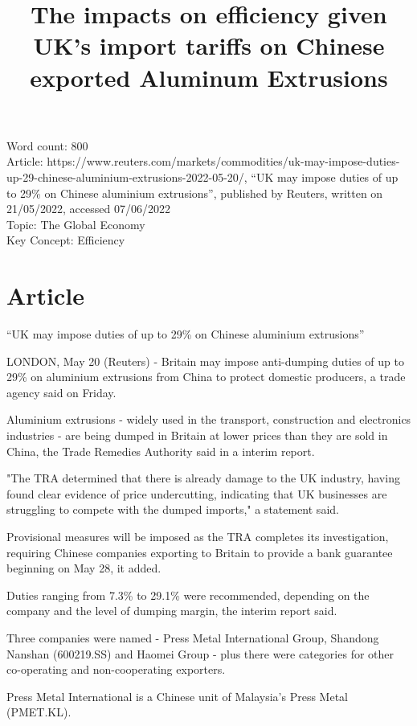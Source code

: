 \documentclass[a4paper,12pt]{article}
\title{The impacts on efficiency given UK's import tariffs on Chinese exported Aluminum Extrusions}
\author{\vspace{-8ex}}
\date{\vspace{-8ex}}
\newcommand{\initTexcount}[1]{\immediate\write18{texcount -inc -incbib
		-sum #1 > .wordcount.tex}}
\newcommand\wordcount{
		}
\begin{document}
\maketitle
Word count: 800\\
Article: https://www.reuters.com/markets/commodities/uk-may-impose-duties-up-29-chinese-aluminium-extrusions-2022-05-20/, ``UK may impose duties of up to 29\% on Chinese aluminium extrusions'', published by Reuters, written on 21/05/2022, accessed 07/06/2022\\
Topic: The Global Economy\\
Key Concept: Efficiency


\newpage

\section*{Article}
``UK may impose duties of up to 29\% on Chinese aluminium extrusions''

LONDON, May 20 (Reuters) - Britain may impose anti-dumping duties of up to 29\% on aluminium extrusions from China to protect domestic producers, a trade agency said on Friday.

Aluminium extrusions - widely used in the transport, construction and electronics industries - are being dumped in Britain at lower prices than they are sold in China, the Trade Remedies Authority said in a interim report.

"The TRA determined that there is already damage to the UK industry, having found clear evidence of price undercutting, indicating that UK businesses are struggling to compete with the dumped imports," a statement said.

Provisional measures will be imposed as the TRA completes its investigation, requiring Chinese companies exporting to Britain to provide a bank guarantee beginning on May 28, it added.

Duties ranging from 7.3\% to 29.1\% were recommended, depending on the company and the level of dumping margin, the interim report said.

Three companies were named - Press Metal International Group, Shandong Nanshan (600219.SS) and Haomei Group - plus there were categories for other co-operating and non-cooperating exporters.

Press Metal International is a Chinese unit of Malaysia's Press Metal (PMET.KL).
\end{document}
